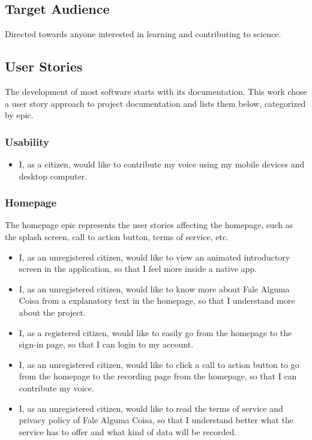 \subsection{Target Audience}

Directed towards anyone interested in learning and contributing to science.

\subsection{User Stories}

The development of most software starts with its documentation. This work chose a user story approach to project documentation and lists them below, categorized by epic.

\subsubsection{Usability}

\begin{itemize}
    \item I, as a citizen, would like to contribute my voice using my mobile devices and desktop computer.
\end{itemize}

\subsubsection{Homepage}

The homepage epic represents the user stories affecting the homepage, such as the splash screen, call to action button, terms of service, etc.

\begin{itemize}
    \item I, as an unregistered citizen, would like to view an animated introductory screen in the application, so that I feel more inside a native app.
    \item I, as an unregistered citizen, would like to know more about Fale Alguma Coisa from a explanatory text in the homepage, so that I understand more about the project.
    \item I, as a registered citizen, would like to easily go from the homepage to the sign-in page, so that I can login to my account.
    \item I, as an unregistered citizen, would like to click a call to action button to go from the homepage to the recording page from the homepage, so that I can contribute my voice.
    \item I, as an unregistered citizen, would like to read the terms of service and privacy policy of Fale Alguma Coisa, so that I understand better what the service has to offer and what kind of data will be recorded.
\end{itemize}

